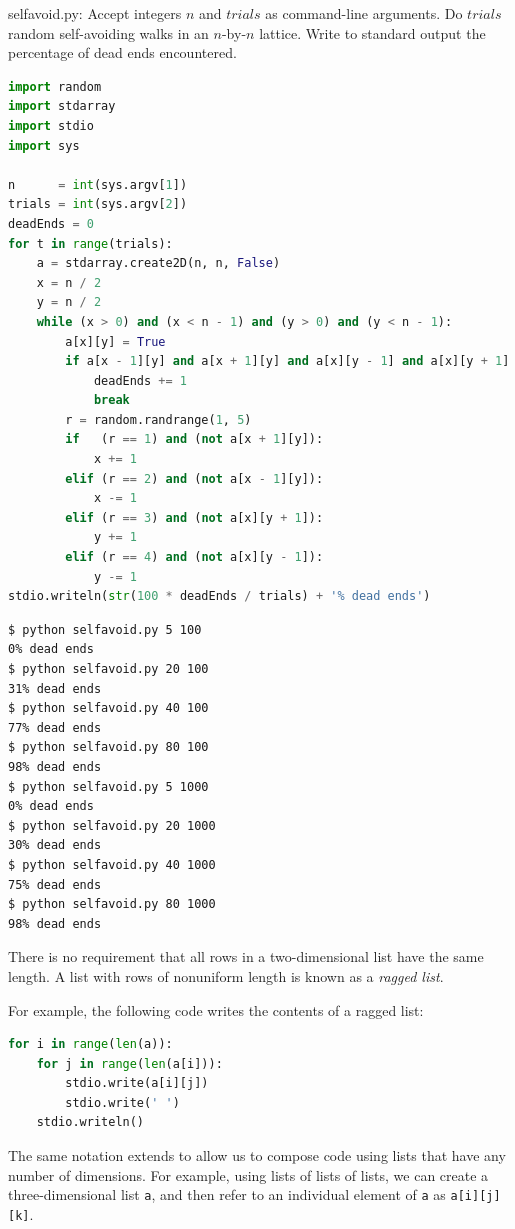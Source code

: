 \documentclass[8pt,a4paper,compress,handout]{beamer}
\begin{document}
\begin{frame}[fragile]
\begin{framed}
\tiny selfavoid.py: Accept integers $n$ and $trials$ as command-line arguments. Do $trials$ random self-avoiding walks in an $n$-by-$n$ lattice. Write to standard output the percentage of dead ends encountered.
\end{framed}

\begin{lstlisting}[language=Python]
import random
import stdarray
import stdio
import sys

n      = int(sys.argv[1])
trials = int(sys.argv[2])
deadEnds = 0
for t in range(trials):
    a = stdarray.create2D(n, n, False)
    x = n / 2
    y = n / 2
    while (x > 0) and (x < n - 1) and (y > 0) and (y < n - 1):
        a[x][y] = True
        if a[x - 1][y] and a[x + 1][y] and a[x][y - 1] and a[x][y + 1]:
            deadEnds += 1
            break
        r = random.randrange(1, 5)
        if   (r == 1) and (not a[x + 1][y]):
            x += 1
        elif (r == 2) and (not a[x - 1][y]):
            x -= 1
        elif (r == 3) and (not a[x][y + 1]):
            y += 1
        elif (r == 4) and (not a[x][y - 1]):
            y -= 1
stdio.writeln(str(100 * deadEnds / trials) + '% dead ends')
\end{lstlisting}
\end{frame}

\begin{frame}[fragile]
\begin{lstlisting}[language={}]
$ python selfavoid.py 5 100
0% dead ends
$ python selfavoid.py 20 100
31% dead ends
$ python selfavoid.py 40 100
77% dead ends
$ python selfavoid.py 80 100
98% dead ends
$ python selfavoid.py 5 1000
0% dead ends
$ python selfavoid.py 20 1000
30% dead ends
$ python selfavoid.py 40 1000
75% dead ends
$ python selfavoid.py 80 1000
98% dead ends
\end{lstlisting}
\end{frame}

\begin{frame}[fragile]
There is no requirement that all rows in a two-dimensional list have the same length. A list with rows of nonuniform length is known as a \emph{ragged list}. 

\bigskip

For example, the following code writes the contents of a ragged list:

\begin{lstlisting}[language=Python]
for i in range(len(a)):
    for j in range(len(a[i])):
        stdio.write(a[i][j])
        stdio.write(' ')
    stdio.writeln()
\end{lstlisting}

\bigskip

The same notation extends to allow us to compose code using lists that have any number of dimensions. For example, using lists of lists of lists, we can create a three-dimensional list \lstinline{a}, and then refer to an individual element of \lstinline{a} as \lstinline{a[i][j][k]}.
\end{frame}
\end{document}
